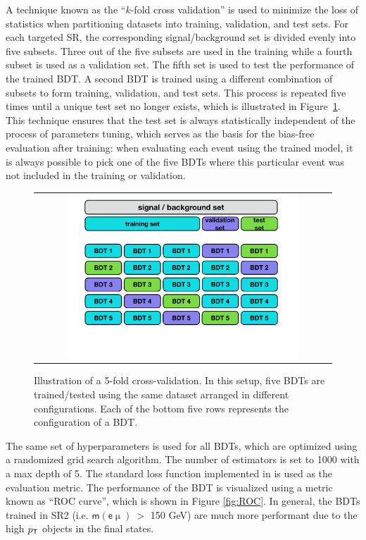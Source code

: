 A technique known as the ``$k$-fold cross validation'' is used to minimize the loss of statistics when partitioning datasets into training, validation, and test sets. For each targeted \ac{SR}, the corresponding signal/background set is divided evenly into five subsets. Three out of the five subsets are used in the training while a fourth subset is used as a validation set. The fifth set is used to test the performance of the trained \ac{BDT}. A second \ac{BDT} is trained using a different combination of subsets to form training, validation, and test sets. This process is repeated five times until a unique test set no longer exists, which is illustrated in Figure~\ref{fig:5fold}. This technique ensures that the test set is always statistically independent of the process of parameters tuning, which serves as the basis for the bias-free evaluation after training: when evaluating each event using the trained model, it is always possible to pick one of the five \acp{BDT} where this particular event was not included in the training or validation.

\begin{figure}[tbh!]
 \begin{center}
  \caption{Illustration of a 5-fold cross-validation. In this setup, five \acp{BDT} are trained/tested using the same dataset arranged in different configurations. Each of the bottom five rows represents the configuration of a \ac{BDT}.}
 \begin{tabular}{c}
 \includegraphics[width=0.8\textwidth]{figures/Part3/BDT/kfold}
 \end{tabular}
 \label{fig:5fold}
 \end{center}
\end{figure}

The same set of hyperparameters is used for all \acp{BDT}, which are optimized using a randomized grid search algorithm. The number of estimators is set to 1000 with a max depth of 5. The standard loss function implemented in \cite{Chen:2016:XST:2939672.2939785} is used as the evaluation metric. The performance of the \ac{BDT} is visualized using a metric known as ``\ac{ROC} curve'', which is shown in Figure \ref{fig:ROC}. In general, the \acp{BDT} trained in \ac{SR}2 (i.e. $\textsf{m}(\textsf{e}\upmu)~>$ 150 GeV) are much more performant due to the high $p_{\textsf{T}}$ objects in the final states.

